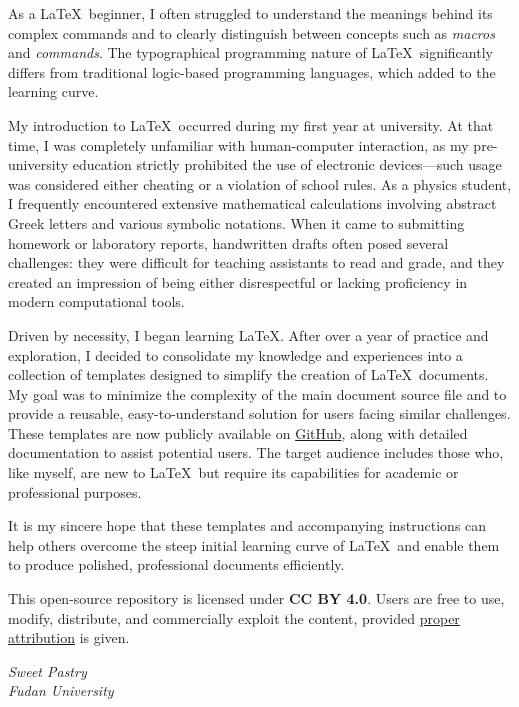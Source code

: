     As a \LaTeX\ beginner, I often struggled to understand the meanings behind its complex commands and to clearly distinguish between concepts such as \emph{macros} and \emph{commands}. The typographical programming nature of \LaTeX\ significantly differs from traditional logic-based programming languages, which added to the learning curve.

    My introduction to \LaTeX\ occurred during my first year at university. At that time, I was completely unfamiliar with human-computer interaction, as my pre-university education strictly prohibited the use of electronic devices—such usage was considered either cheating or a violation of school rules. As a physics student, I frequently encountered extensive mathematical calculations involving abstract Greek letters and various symbolic notations. When it came to submitting homework or laboratory reports, handwritten drafts often posed several challenges: they were difficult for teaching assistants to read and grade, and they created an impression of being either disrespectful or lacking proficiency in modern computational tools.

    Driven by necessity, I began learning \LaTeX. After over a year of practice and exploration, I decided to consolidate my knowledge and experiences into a collection of templates designed to simplify the creation of \LaTeX\ documents. My goal was to minimize the complexity of the main document source file and to provide a reusable, easy-to-understand solution for users facing similar challenges. These templates are now publicly available on \href{https://github.com/SweetPastry/spTemplate?tab=CC-BY-4.0-1-ov-file}{GitHub}, along with detailed documentation to assist potential users. The target audience includes those who, like myself, are new to \LaTeX\ but require its capabilities for academic or professional purposes.

    It is my sincere hope that these templates and accompanying instructions can help others overcome the steep initial learning curve of \LaTeX\ and enable them to produce polished, professional documents efficiently.
    
    This open-source repository is licensed under \textbf{CC BY 4.0}. Users are free to use, modify, distribute, and commercially exploit the content, provided \href{https://github.com/SweetPastry/spTemplate/blob/main/LICENSE}{proper attribution} is given.

    \vspace{2cm}
    \begin{flushright}
        \textit{Sweet Pastry} \\[1em]
        \textit{Fudan University}
    \end{flushright}